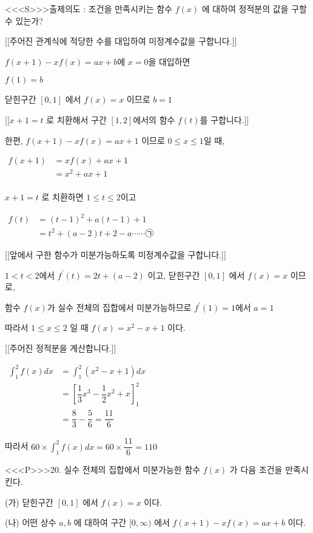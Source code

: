 \documentclass{oblivoir}
\begin{document}
<<<S>>>출제의도 : 조건을 만족시키는 함수 $f(x)$ 에 대하여 정적분의 값을 구할 수 있는가?

[[주어진 관계식에 적당한 수를 대입하여 미정계수값을 구합니다.]]

$f(x+1)-x f(x)=a x+b$에 $x=0$을 대입하면

$f(1)=b$

닫힌구간 $[0,1]$ 에서 $f(x)=x$ 이므로 $b=1$

[[$x+1=t$ 로 치환해서 구간 $[1, 2]$에서의 함수 $f(t)$를 구합니다.]]

한편, $f(x+1)-x f(x)=a x+1$ 이므로 $0 \leq x \leq 1$일 때, 

$\begin{aligned} f(x+1) &=x f(x)+a x+1\\
&=x^{2}+a x+1\\
\end{aligned}$

$x+1=t$ 로 치환하면 $1 \leq t \leq 2$이고

$\begin{aligned} f(t) &=(t-1)^{2}+a(t-1)+1\\
&=t^{2}+(a-2) t+2-a \cdots \cdots \text{㉠} \end{aligned} $ 

[[앞에서 구한 함수가 미분가능하도록 미정계수값을 구합니다.]]

$1<t<2$에서 $f^{\prime}(t)=2 t+(a-2)$ 이고, 닫힌구간 $[0,1]$ 에서 $f(x)=x$ 이므로,

함수 $f(x)$가 실수 전체의 집합에서 미분가능하므로 $f^{\prime}(1)=1$에서 $a=1$

따라서 $1 \leq x \leq 2$ 일 때 $f(x)=x^{2}-x+1$ 이다.

[[주어진 정적분을 계산합니다.]]

$ \begin{aligned}\displaystyle\int_{1}^{2} f(x) d x &=\displaystyle\int_{1}^{2}\left(x^{2}-x+1\right) d x\\
&=\left[\dfrac{1}{3} x^{3}-\dfrac{1}{2} x^{2}+x\right]_{1}^{2}\\
&=\dfrac{8}{3}-\dfrac{5}{6}=\dfrac{11}{6}\end{aligned}$

따라서 $60 \times \displaystyle\int_{1}^{2} f(x) d x=60 \times \dfrac{11}{6} =110$


<<<P>>>20. 실수 전체의 집합에서 미분가능한 함수 $f(x)$ 가 다음 조건을 만족시킨다.

(가) 닫힌구간 $[0,1]$ 에서 $f(x)=x$ 이다.

(나) 어떤 상수 $a, b$ 에 대하여 구간 $[0, \infty)$ 에서 $f(x+1)-x f(x)=a x+b$ 이다.
\end{document}
